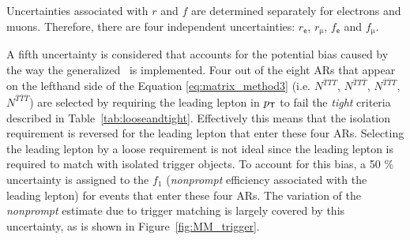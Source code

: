 Uncertainties associated with $r$ and $f$ are determined separately for electrons and muons. Therefore, there are four independent uncertainties: $r_{\textsf{e}}$, $r_{\upmu}$, $f_{\textsf{e}}$ and $f_{\upmu}$. 

A fifth uncertainty is considered that accounts for the potential bias caused by the way the generalized \mm~is implemented. Four out of the eight \acp{AR} that appear on the lefthand side of the Equation \ref{eq:matrix_method3} (i.e. $N^{\overline{T}TT}$, $N^{\overline{T}T\overline{T}}$, $N^{\overline{T}\overline{T}T}$, $N^{\overline{T}\overline{T}\overline{T}}$) are selected by requiring the leading lepton in $p_{\textsf{T}}$ to fail the \emph{tight} criteria described in Table~\ref{tab:looseandtight}. Effectively this means that the isolation requirement is reversed for the leading lepton that enter these four \acp{AR}. Selecting the leading lepton by a loose requirement is not ideal since the leading lepton is required to match with isolated trigger objects. To account for this bias, a 50 $\%$ uncertainty is assigned to the $f_1$ (\emph{nonprompt} efficiency associated with the leading lepton) for events that enter these four \acp{AR}. The variation of the \emph{nonprompt} estimate due to trigger matching is largely covered by this uncertainty, as is shown in Figure~\ref{fig:MM_trigger}.

